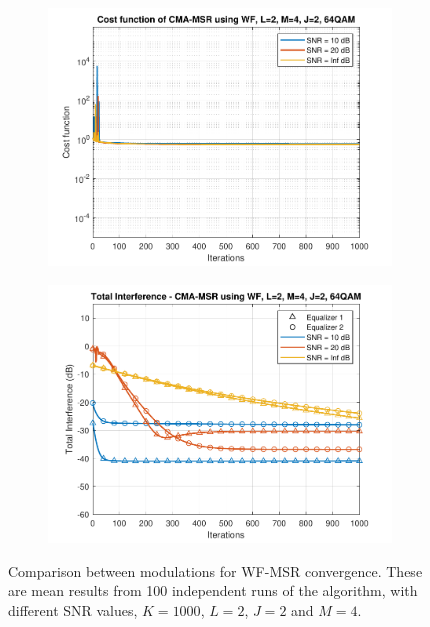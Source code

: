 \begin{figure}
\begin{subfigure}[b]{0.45\textwidth}
		\includegraphics[width=\linewidth]{./figs/BF_WF_MSR_cost_64QAM_L=2_M=4_J=2_K=1000.pdf}
		\label{fig:wf_msr_cost64}
	\end{subfigure}
	\begin{subfigure}[b]{0.45\textwidth}
		\includegraphics[width=\linewidth]{./figs/BF_WF_MSR_TI_64QAM_L=2_M=4_J=2_K=1000.pdf}
		\label{fig:wf_msr_ti64}
	\end{subfigure}
	\caption{Comparison between modulations for WF-MSR convergence. These are mean results from 100 independent runs of the algorithm, with different SNR values, $K=1000$, $L=2$, $J=2$ and $M=4$.}
	\label{fig:CMA_WF_msr_mods_L2M4}
\end{figure}

